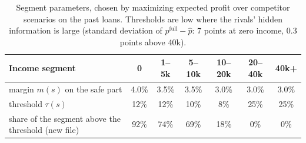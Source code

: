 \documentclass[11pt,a4paper]{article}
\begin{document}
\begin{table}[h]\centering\small
\begin{tabular}{lcccccc}
\toprule
Income segment & 0 & 1--5k & 5--10k & 10--20k & 20--40k & 40k+\\
\midrule
margin $m(s)$ on the safe part & 4.0\% & 3.5\% & 3.5\% & 3.0\% & 3.0\% & 3.0\%\\
threshold $\tau(s)$ & 12\% & 12\% & 10\% & 8\% & 25\% & 25\%\\
share of the segment above the threshold (new file) & 92\% & 74\% & 69\% & 18\% & 0\% & 0\%\\
\bottomrule
\end{tabular}
\caption{Segment parameters, chosen by maximizing expected profit over competitor scenarios on the past loans. Thresholds
are low where the rivals' hidden information is large (standard deviation of $p^{\text{full}}-\hat p$: 7 points at zero
income, 0.3 points above 40k).}
\label{tab:params}
\end{table}

\begin{table}[h]\centering\small
{}
\caption{The rule at a glance, for an applicant with income 5--10k (threshold 10\%, margin 3.5\%). Example: income
7,000~\texteuro{}, PD 12\%: plain break-even $0.12/0.88 = 13.6\%$; the applicants we would win at that PD default 14.1\%, so the
adjusted break-even is $0.141/0.859 = 16.4\%$; the margin at 12\% PD is 3.9 points; offer 20.3\%.}
\label{tab:glance}
\end{table}
\end{document}
